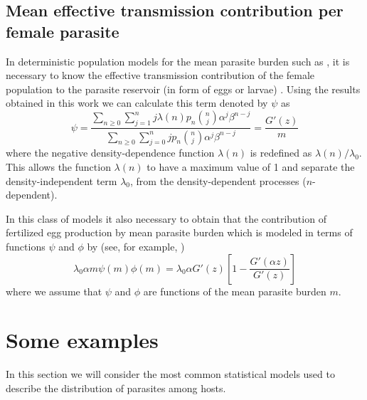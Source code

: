 \documentclass[bimj,fleqn]{w-art}
\theoremstyle{plain}
\theoremstyle{definition}
\begin{document}
\subsection{Mean effective transmission contribution per female parasite}
In deterministic population models  for the  mean parasite burden such as \cite{anderson1985helminth,anderson1992infectious,truscott2014modeling}, 
it is necessary to know the effective transmission contribution of the  female population to the parasite reservoir (in form of eggs or larvae)  \cite{churcher2005density,churcher2006density}.
Using the results obtained in this work we can calculate this term denoted by $\psi$ as
\begin{equation}\label{psi}
\psi=\frac{\sum_{n\geq 0}\sum_{j=1}^{n}j\lambda(n)p_n\binom{n}{j}\alpha^j\beta^{n-j}}
{\sum_{n\geq 0}\sum_{j=0}^{n}jp_n\binom{n}{j}\alpha^j\beta^{n-j}}
=\frac{G'(z)}{m}   
\end{equation}
where the negative density-dependence function $\lambda(n)$ is redefined as $\lambda(n)/\lambda_0$.
This allows the function $\lambda(n)$ to have a maximum value of 1
and separate the density-independent term $\lambda_0$, from the density-dependent processes ($n$-dependent).



In this class of models it also necessary to obtain that the contribution of fertilized egg production by mean parasite burden which is modeled  in
terms of functions $\psi$ and $\phi$ by (see, for example,  \cite{anderson1992infectious})
\begin{equation}
\lambda_0\alpha m \psi(m) \phi(m)= \lambda_0 \alpha G'(z) \left[1-\frac{ G'(\alpha z)}{G'(z)}\right] 	
\end{equation}
where we assume that $\psi$ and $\phi$ are functions of the mean parasite burden $m$.  
%	

\section{Some examples}\label{sec:ejemplos}
In this section we will consider the most common statistical models used to describe the distribution of parasites among hosts.
\end{document}
